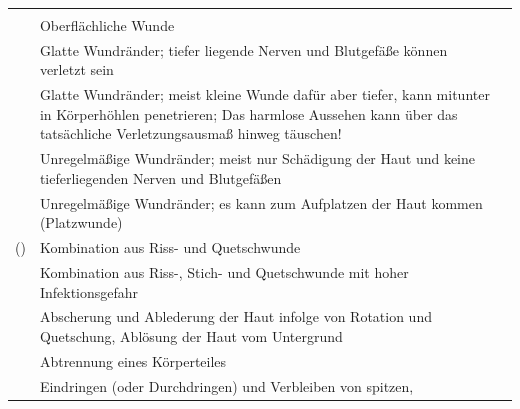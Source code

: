{%

}{
}{\label{tab:Wundarten}
\begin{tabulary}{\linewidth}{lLL}\addlinespace\toprule\addlinespace
\noindent{} & \noindent{} & \noindent{}
\\\addlinespace\midrule\addlinespace
\noindent{} 
&
Oberflächliche Wunde
& 
\noindent{}
\\\addlinespace
\noindent{}
&
Glatte Wundränder; tiefer liegende Nerven und Blutgefäße
können verletzt sein
& 
\noindent{}
\\\addlinespace
\noindent{}
&
Glatte Wundränder; meist kleine Wunde dafür aber tiefer,
kann mitunter in Körperhöhlen penetrieren; Das harmlose
Aussehen kann über das tatsächliche Verletzungsausmaß hinweg
täuschen!
& 
\noindent{}
\\\addlinespace 
\noindent{}
&
Unregelmäßige Wundränder; meist nur Schädigung der Haut und
	keine tieferliegenden Nerven und Blutgefäßen
& 
\noindent{}
\\\addlinespace
\noindent{}
&
Unregelmäßige Wundränder; es kann zum Aufplatzen der Haut kommen (Platzwunde)
& 
\noindent{}
\\\addlinespace
\noindent{} ()
&
Kombination aus Riss- und Quetschwunde
& 
\noindent{}
\\\addlinespace
\noindent{} 
&
Kombination aus Riss-, Stich- und Quetschwunde mit hoher Infektionsgefahr
& 
\noindent{}
\\\addlinespace
\noindent{} 
&
Abscherung und Ablederung der Haut infolge von Rotation und Quetschung, Ablösung der Haut vom Untergrund
& 
\noindent{}
\\\addlinespace
\noindent{} 
&
Abtrennung eines Körperteiles
& 
\noindent{}
\\\addlinespace
\noindent{} 
&
Eindringen (oder Durchdringen) und Verbleiben von spitzen,

\end{tabulary}}
